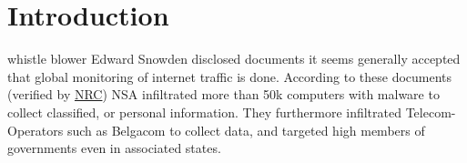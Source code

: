 \documentclass[9pt,journal,compsoc]{IEEEtran}
\begin{document}
\section{Introduction}
%
%



% 
% 
% 
% 
 whistle blower Edward Snowden disclosed documents it seems generally accepted that global monitoring of internet traffic is done. According to these documents (verified by \href{http://www.nrc.nl/nieuws/2013/11/23/nederland-sinds-1946-doelwit-van-nsa}{NRC}) NSA infiltrated more than 50k computers with malware to collect classified, or personal information. They furthermore infiltrated Telecom-Operators such as Belgacom to collect data, and targeted high members of governments even in associated states. 
\end{document}
